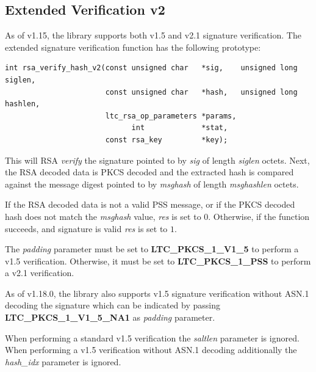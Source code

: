 \documentclass[synpaper]{book}
\begin{document}
\subsection{Extended Verification v2}
\label{rsa-verify-v2}

As of v1.15, the library supports both v1.5 and v2.1 signature verification.  The extended signature verification function has the following prototype:

\begin{verbatim}
int rsa_verify_hash_v2(const unsigned char   *sig,    unsigned long  siglen,
                       const unsigned char   *hash,   unsigned long  hashlen,
                       ltc_rsa_op_parameters *params,
                             int             *stat,
                       const rsa_key         *key);
\end{verbatim}

This will RSA \textit{verify} the signature pointed to by \textit{sig} of length \textit{siglen} octets.  Next, the RSA decoded data is PKCS decoded
and the extracted hash is compared against the message digest pointed to by \textit{msghash} of length \textit{msghashlen} octets.

If the RSA decoded data is not a valid PSS message, or if the PKCS decoded hash does not match the \textit{msghash}
value, \textit{res} is set to $0$.  Otherwise, if the function succeeds, and signature is valid \textit{res} is set to $1$.

The \textit{padding} parameter must be set to \textbf{LTC\_PKCS\_1\_V1\_5} to perform a v1.5 verification.  Otherwise, it must be set to
\textbf{LTC\_PKCS\_1\_PSS} to perform a v2.1 verification.

As of v1.18.0, the library also supports v1.5 signature verification without ASN.1 decoding the signature which can be indicated by passing
\textbf{LTC\_PKCS\_1\_V1\_5\_NA1} as \textit{padding} parameter.

When performing a standard v1.5 verification the \textit{saltlen} parameter is ignored.
When performing a v1.5 verification without ASN.1 decoding additionally the \textit{hash\_idx} parameter is ignored.
\end{document}
